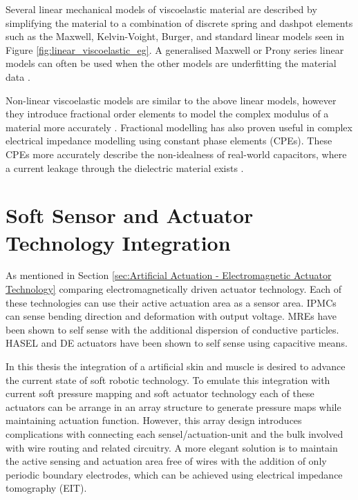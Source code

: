 Several linear mechanical models of viscoelastic material are described by simplifying the material to a combination of discrete spring and dashpot elements such as the Maxwell, Kelvin-Voight, Burger, and standard linear models seen in Figure \ref{fig:linear_viscoelastic_eg}. A generalised Maxwell or Prony series linear models can often be used when the other models are underfitting the material data \cite{Babaei2015,Tzikang2000}. 

Non-linear viscoelastic models are similar to the above linear models, however they introduce fractional order elements to model the complex modulus of a material more accurately \cite{Bonfanti2020}. Fractional modelling has also proven useful in complex electrical impedance modelling using constant phase elements (CPEs). These CPEs more accurately describe the non-idealness of real-world capacitors, where a current leakage through the dielectric material exists \cite{Vosika2013, Chang2022}.


\section{Soft Sensor and Actuator Technology Integration}


As mentioned in Section \ref{sec:Artificial Actuation - Electromagnetic Actuator Technology} comparing electromagnetically driven actuator technology. Each of these technologies can use their active actuation area as a sensor area. IPMCs can sense bending direction and deformation with output voltage. MREs have been shown to self sense with the additional dispersion of conductive particles. HASEL and DE actuators have been shown to self sense using capacitive means. 

In this thesis the integration of a artificial skin and muscle is desired to advance the current state of soft robotic technology. To emulate this integration with current soft pressure mapping and soft actuator technology each of these actuators can be arrange in an array structure to generate pressure maps while maintaining actuation function. However, this array design introduces complications with connecting each sensel/actuation-unit and the bulk involved with wire routing and related circuitry. A more elegant solution is to maintain the active sensing and actuation area free of wires with the addition of only periodic boundary electrodes, which can be achieved using electrical impedance tomography (EIT).

